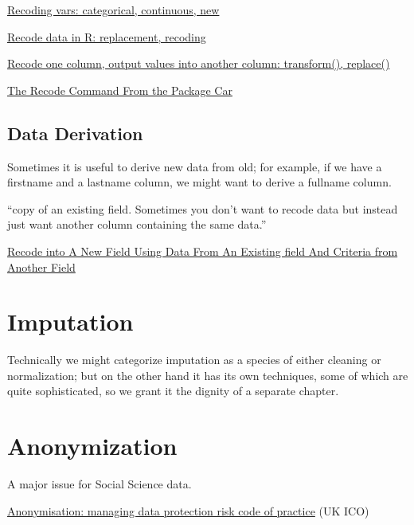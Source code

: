 \href{http://www.cookbook-r.com/Manipulating\_data/Recoding\_data/}{Recoding vars: categorical, continuous, new}

\href{http://rprogramming.net/recode-data-in-r/}{Recode data in R: replacement, recoding}

\href{http://rwiki.sciviews.org/doku.php?id=tips:data-frames:recode_column}{Recode one column, output values into another column: transform(), replace()}

\href{http://rprogramming.net/recode-data-in-r/}{The Recode Command From the Package Car}

\section{Data Derivation}
\label{sect:newvars}

Sometimes it is useful to derive new data from old; for example, if we
have a firstname and a lastname column, we might want to derive a
fullname column.

``copy of an existing field. Sometimes you don’t want to recode data but instead just want another column containing the same data.''

\href{http://rprogramming.net/recode-data-in-r/}{Recode into A New Field Using Data From An Existing field And Criteria from Another Field}

\chapter{Imputation}

\begin{ednote}
Technically we might categorize imputation as a species of either
cleaning or normalization; but on the other hand it has its own
techniques, some of which are quite sophisticated, so we grant it the
dignity of a separate chapter.
\end{ednote}

\chapter{Anonymization}

A major issue for Social Science data.

\href{http://ico.org.uk/for\_organisations/data\_protection/topic\_guides/anonymisation}{Anonymisation:
  managing data protection risk code of practice} (UK ICO)

